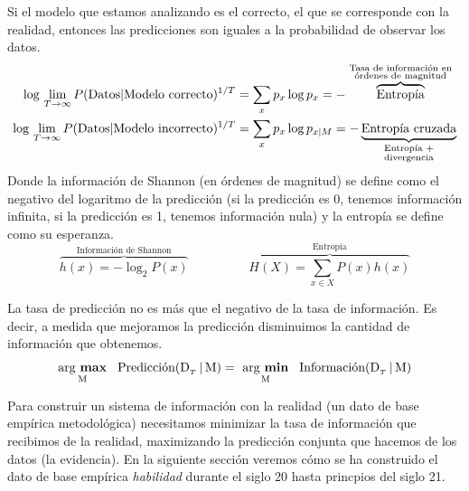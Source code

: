 \documentclass[a4paper,11pt]{book}
\newcommand\hfrac[2]{\genfrac{}{}{0pt}{}{#1}{#2}} %
\theoremstyle{definition}
\begin{document}
Si el modelo que estamos analizando es el correcto, el que se corresponde con la realidad, entonces las predicciones son iguales a la probabilidad de observar los datos.
%
\begin{align*}
\log \, \lim_{T \rightarrow \infty} P(\text{Datos}|\text{Modelo correcto})^{1/T} &= \sum_x p_x \log p_x = - \overbrace{\text{Entrop\'ia}}^{\hfrac{\text{\scriptsize Tasa de informaci\'on en}}{\text{\scriptsize \'ordenes de magnitud}}} \\
\log \, \lim_{T \rightarrow \infty} P(\text{Datos}|\text{Modelo incorrecto})^{1/T} &= \sum_x p_x \log p_{x|M} = - \underbrace{\text{Entrop\'ia cruzada}}_{\hfrac{\text{\scriptsize Entrop\'ia +}}{\text{\scriptsize divergencia}}}
\end{align*}
%
Donde la informaci\'on de Shannon (en \'ordenes de magnitud) se define como el negativo del logaritmo de la predicci\'on (si la predicci\'on es 0, tenemos informaci\'on infinita, si la predicci\'on es 1, tenemos informaci\'on nula) y la entrop\'ia se define como su esperanza.
%
\begin{equation*}
\overbrace{h(x) = - \log_2 P(x)}^{\text{Informaci\'on de Shannon}}  \hspace{2cm} \overbrace{H(X) = \sum_{x\in X} P(x) h(x)}^{\text{Entrop\'ia}}
\end{equation*}


La tasa de predicci\'on no es m\'as que el negativo de la tasa de informaci\'on.
%
Es decir, a medida que mejoramos la predicci\'on disminuimos la cantidad de informaci\'on que obtenemos.
%
\begin{equation*}
\underset{\text{M}}{\text{arg \textbf{max}}}
\hspace{0.3cm}  \text{Predicci\'on}(\text{D}_{_T} \, | \, \text{M}) = \ \underset{\text{M}}{\text{arg \textbf{min}}} \hspace{0.3cm} \text{Informaci\'on} (\text{D}_{_T}\,|\,\text{M})
\end{equation*}


Para construir un sistema de informaci\'on con la realidad (un dato de base emp\'irica metodol\'ogica) necesitamos minimizar la tasa de informaci\'on que recibimos de la realidad, maximizando la predicci\'on conjunta que hacemos de los datos (la evidencia).
%
En la siguiente secci\'on veremos c\'omo se ha construido el dato de base emp\'irica \emph{habilidad} durante el siglo 20 hasta princpios del siglo 21.
\end{document}
